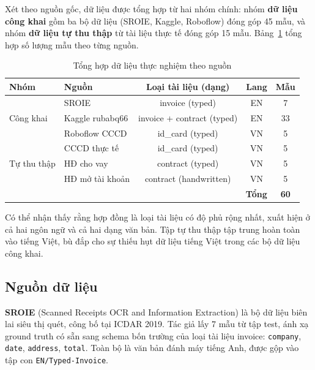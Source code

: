 ﻿\documentclass[12pt]{report}
\begin{document}
Xét theo nguồn gốc, dữ liệu được tổng hợp từ hai nhóm chính: nhóm \textbf{dữ liệu công khai}
gồm ba bộ dữ liệu (SROIE, Kaggle, Roboflow) đóng góp 45 mẫu, và nhóm \textbf{dữ liệu tự thu thập}
từ tài liệu thực tế đóng góp 15 mẫu. Bảng~\ref{tab:datasets} tổng hợp số lượng mẫu theo từng nguồn.

\begin{table}[h]
\centering
\caption{Tổng hợp dữ liệu thực nghiệm theo nguồn}
\label{tab:datasets}
\begin{tabular}{|l|l|c|c|c|}
\hline
\textbf{Nhóm} & \textbf{Nguồn} & \textbf{Loại tài liệu (dạng)} & \textbf{Lang} & \textbf{Mẫu} \\ \hline
\multirow{3}{*}{Công khai}   & SROIE           & invoice (typed)             & EN & 7 \\ \cline{2-5}
                             & Kaggle rubabq66 & invoice + contract (typed)  & EN & 33 \\ \cline{2-5}
                             & Roboflow CCCD   & id\_card (typed)            & VN & 5 \\ \hline
\multirow{3}{*}{Tự thu thập} & CCCD thực tế    & id\_card (typed)            & VN & 5 \\ \cline{2-5}
                             & HĐ cho vay      & contract (typed)            & VN & 5 \\ \cline{2-5}
                             & HĐ mở tài khoản & contract (handwritten)      & VN & 5 \\ \hline
\multicolumn{4}{|r|}{\textbf{Tổng}} & \textbf{60} \\ \hline
\end{tabular}
\end{table}

Có thể nhận thấy rằng hợp đồng là loại tài liệu có độ phủ rộng nhất, xuất hiện ở cả hai ngôn ngữ
và cả hai dạng văn bản. Tập tự thu thập tập trung hoàn toàn vào tiếng Việt, bù đắp cho sự thiếu
hụt dữ liệu tiếng Việt trong các bộ dữ liệu công khai.

\subsection{Nguồn dữ liệu}\label{sec:data_sources}

\textbf{SROIE} (Scanned Receipts OCR and Information Extraction)\cite{huang2019sroie} là bộ
dữ liệu biên lai siêu thị quét, công bố tại ICDAR 2019. Tác giả lấy 7 mẫu từ tập test, ánh
xạ ground truth có sẵn sang schema bốn trường của loại tài liệu invoice:
\texttt{company}, \texttt{date}, \texttt{address}, \texttt{total}. Toàn bộ là văn bản đánh
máy tiếng Anh, được gộp vào tập con \texttt{EN/Typed-Invoice}.
\end{document}
